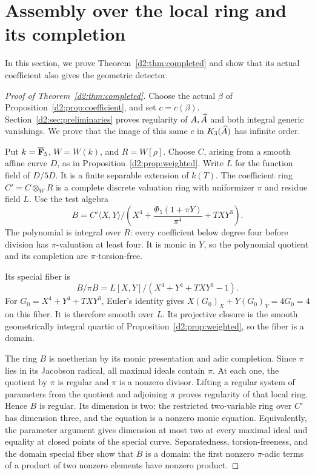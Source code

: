 \section{Assembly over the local ring and its completion}\label{d2:sec:assembly}

In this section, we prove Theorem~\ref{d2:thm:completed} and show that its
actual coefficient also gives the geometric detector.

\begin{proof}[Proof of Theorem~\ref{d2:thm:completed}]
Choose the actual \(\beta\) of Proposition~\ref{d2:prop:coefficient},
and set \(c=c(\beta)\).
Section~\ref{d2:sec:preliminaries} proves regularity of \(A,\widehat A\)
and both integral generic vanishings.
We prove that the image of this same \(c\) in \(K_3(\widehat A)\) has
infinite order.

Put \(k=\overline{\mathbf{F}}_5\), \(W=W(k)\), and \(R=W[\rho]\).
Choose \(C\), arising from a smooth affine curve \(D\), as in
Proposition~\ref{d2:prop:weighted}.
Write \(L\) for the function field of \(D/5D\).
It is a finite separable extension of \(k(T)\).
The coefficient ring \(C'=C\otimes_WR\) is a complete discrete
valuation ring with uniformizer \(\pi\) and residue field \(L\).
Use the test algebra
\begin{equation}\label{d2:eq:test-algebra}
 B=C'\langle X,Y\rangle/
 \left(X^4+\frac{\Phi_5(1+\pi Y)}{\pi^4}+TXY^3\right).
\end{equation}
The polynomial is integral over \(R\): every coefficient below
degree four before division has \(\pi\)-valuation at least four.
It is monic in \(Y\), so the polynomial quotient and its completion
are \(\pi\)-torsion-free.

Its special fiber is
\begin{equation}\label{d2:eq:test-special}
 B/\pi B=L[X,Y]/(X^4+Y^4+TXY^3-1).
\end{equation}
For \(G_0=X^4+Y^4+TXY^3\), Euler's identity gives
\(X(G_0)_X+Y(G_0)_Y=4G_0=4\) on this fiber.
It is therefore smooth over \(L\).
Its projective closure is the smooth geometrically integral quartic
of Proposition~\ref{d2:prop:weighted}, so the fiber is a domain.

The ring \(B\) is noetherian by its monic presentation and adic
completion. Since \(\pi\) lies in its Jacobson radical, all maximal
ideals contain \(\pi\).
At each one, the quotient by \(\pi\) is regular and \(\pi\) is a
nonzero divisor. Lifting a regular system of parameters from the
quotient and adjoining \(\pi\) proves regularity of that local ring.
Hence \(B\) is regular.
Its dimension is two: the restricted two-variable ring over \(C'\)
has dimension three, and the equation is a nonzero monic equation.
Equivalently, the parameter argument gives dimension at most two
at every maximal ideal and equality at closed points of the special
curve.
Separatedness, torsion-freeness, and the domain special fiber show
that \(B\) is a domain: the first nonzero \(\pi\)-adic terms of a
product of two nonzero elements have nonzero product.


\end{proof}
